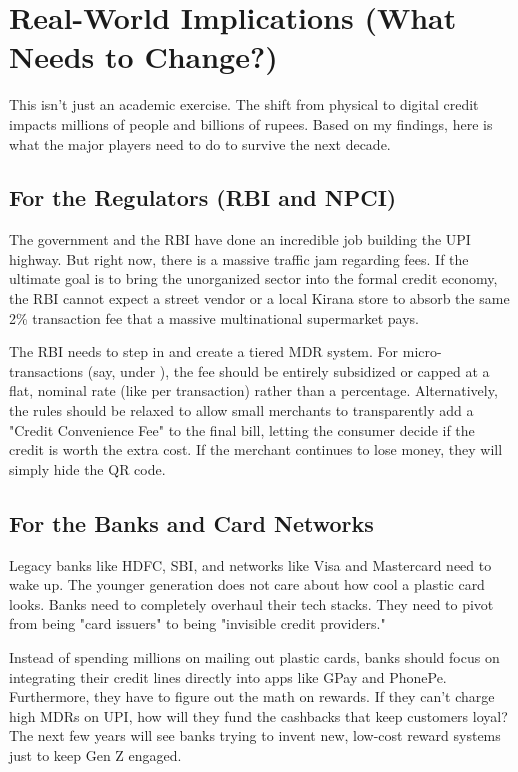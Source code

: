\section{Real-World Implications (What Needs to Change?)}

This isn't just an academic exercise. The shift from physical to digital credit impacts millions of people and billions of rupees. Based on my findings, here is what the major players need to do to survive the next decade.

\subsection{For the Regulators (RBI and NPCI)}
The government and the RBI have done an incredible job building the UPI highway. But right now, there is a massive traffic jam regarding fees. If the ultimate goal is to bring the unorganized sector into the formal credit economy, the RBI cannot expect a street vendor or a local Kirana store to absorb the same 2\% transaction fee that a massive multinational supermarket pays.

The RBI needs to step in and create a tiered MDR system. For micro-transactions (say, under ), the fee should be entirely subsidized or capped at a flat, nominal rate (like  per transaction) rather than a percentage. Alternatively, the rules should be relaxed to allow small merchants to transparently add a "Credit Convenience Fee" to the final bill, letting the consumer decide if the credit is worth the extra cost. If the merchant continues to lose money, they will simply hide the QR code.

\subsection{For the Banks and Card Networks}
Legacy banks like HDFC, SBI, and networks like Visa and Mastercard need to wake up. The younger generation does not care about how cool a plastic card looks. Banks need to completely overhaul their tech stacks. They need to pivot from being "card issuers" to being "invisible credit providers."

Instead of spending millions on mailing out plastic cards, banks should focus on integrating their credit lines directly into apps like GPay and PhonePe. Furthermore, they have to figure out the math on rewards. If they can't charge high MDRs on UPI, how will they fund the cashbacks that keep customers loyal? The next few years will see banks trying to invent new, low-cost reward systems just to keep Gen Z engaged.


